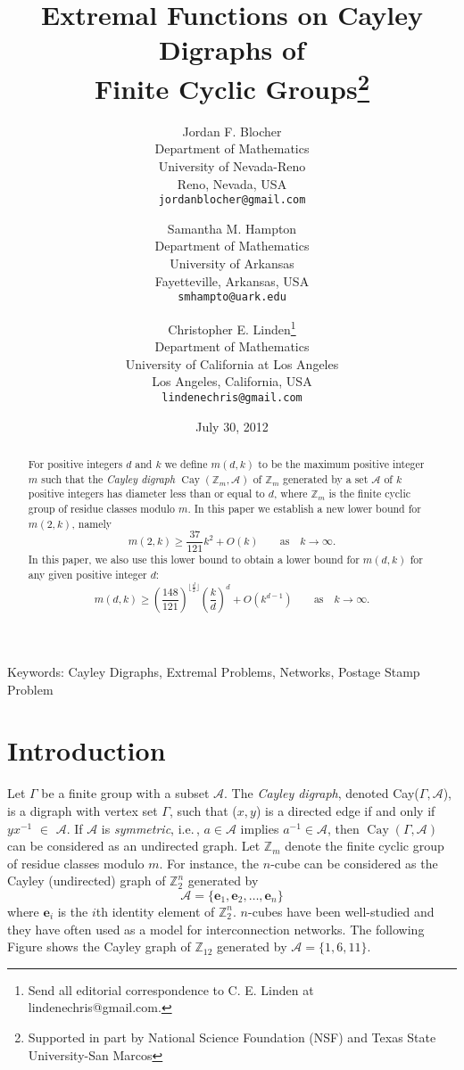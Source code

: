\documentclass[11pt]{article}
\title{Extremal Functions on Cayley Digraphs of\\ Finite Cyclic Groups\footnote{Supported in part by National Science Foundation (NSF) and Texas State University-San Marcos}}
\author{{\sc Jordan F. Blocher}\\ 
Department of Mathematics\\ 
University of Nevada-Reno\\ 
Reno, Nevada, USA\\
{\tt jordanblocher@gmail.com}
\and 
{\sc Samantha M. Hampton}\\
Department of Mathematics\\
University of Arkansas\\
Fayetteville, Arkansas, USA\\
{\tt smhampto@uark.edu}
\and 
{\sc Christopher E. Linden}\thanks{Send all editorial correspondence to C. E. Linden at lindenechris@gmail.com.}\\
Department of Mathematics\\
University of California  at Los Angeles\\
Los Angeles, California, USA\\
{\tt lindenechris@gmail.com} }
\date{July 30, 2012}
\theoremstyle{definition}
\def\Z{\mbox{$\mathbb Z$}}
\def\Cay{\operatorname{Cay}}
\begin{document}
 
\baselineskip6mm\parskip4mm

\maketitle

\begin{abstract}
For positive integers $d$ and $k$ we define $m(d,k)$ to be the maximum positive integer $m$ such that the \emph{Cayley digraph} $\Cay(\Z_{m}, \mathscr{A})$ of $\Z_{m}$ generated by a set $\mathscr{A}$ of $k$ positive integers has diameter less than or equal to $d$, where $\Z_{m}$ is the finite cyclic group of residue classes modulo $m$.
In this paper we establish a new lower bound for $m(2, k)$, namely
\[
 m(2,k) \geq \frac{37}{121}k^2 + O(k)\qquad\text{as}\quad k\to\infty.
\]
In this paper, we  also use this lower bound to obtain a lower bound for  $m(d,k)$ for any given positive integer $d$:
\[
m(d,k) \geq \left(\frac{148}{121}\right)^{\lfloor \frac{d}{2}\rfloor}\left(\frac{k}{d}\right)^d + O(k^{d-1})\qquad\text{as}\quad k\to\infty.
\]
\end{abstract}
 
{\small\sc Keywords:} {\small Cayley Digraphs, Extremal Problems, Networks, Postage Stamp Problem}
 

\section{Introduction}
Let $\Gamma$ be a finite group with a subset $\mathscr{A}$. The \emph{Cayley digraph}, denoted Cay($\Gamma, \mathscr{A}$), is a digraph with vertex set $\Gamma$, such that ($x, y$) is a directed edge if and only if $yx^{-1}$ $\in$ $\mathscr{A}$.  If $\mathscr A$ is {\em symmetric}, i.e.\,, $a\in \mathscr A$ implies $a^{-1}\in \mathscr A$, then $\Cay(\Gamma,\mathscr A)$ can be considered as an undirected graph.  Let $\Z_{m}$ denote the finite cyclic group of residue classes modulo $m$.  For instance, the $n$-cube can be considered as the Cayley (undirected) graph of $\Z_{2}^{n}$ generated by 
\[
\mathscr {A}=\{\mathbf e_{1},\mathbf e_{2},\ldots,\mathbf e_{n}\}
\]
where $\mathbf e_{i}$ is the $i$th identity element of $\Z_{2}^{n}$. $n$-cubes have been  well-studied and they have often  used as a model for interconnection networks. The following Figure shows the Cayley graph of $\Z_{12}$ generated by $\mathscr A=\{1,6,11\}$.
\end{document}
